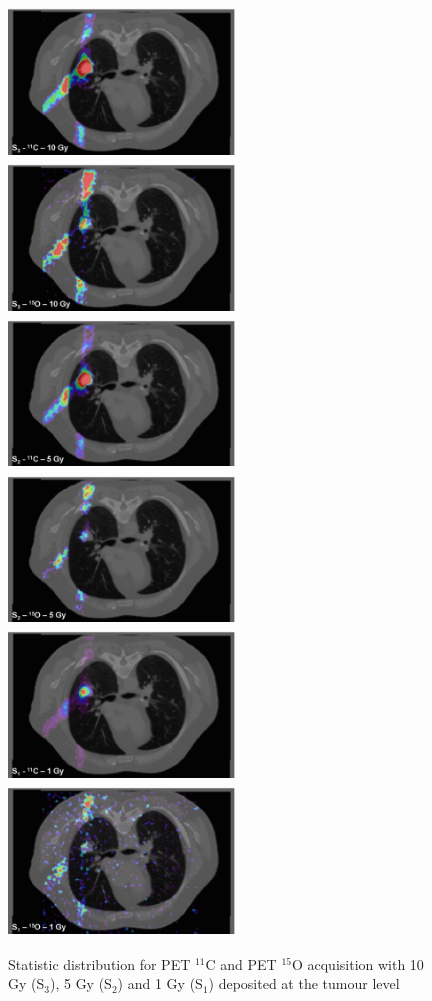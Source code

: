 \documentclass[11pt]{iopart}
\begin{document}
\begin{figure}[!h]
\centering
\includegraphics[width=6cm,height=40mm]{figures/C11_10Gy_v1.jpg}
\includegraphics[width=6cm,height=40mm]{figures/O15_10Gy_v1.jpg}
\includegraphics[width=6cm,height=40mm]{figures/C11_5Gy_v1.jpg}
\includegraphics[width=6cm,height=40mm]{figures/O15_5Gy_v1.jpg}
\includegraphics[width=6cm,height=40mm]{figures/C11_1Gy_v1.jpg}
\includegraphics[width=6cm,height=40mm]{figures/O15_1Gy_v1.jpg}
\caption{Statistic distribution for PET $^{11}$C and PET $^{15}$O acquisition with 10 Gy (S$_{3}$), 5 Gy (S$_{2}$) and 1 Gy (S$_{1}$) deposited at the tumour level}
\label{fig:fig3}
\end{figure}
\end{document}
